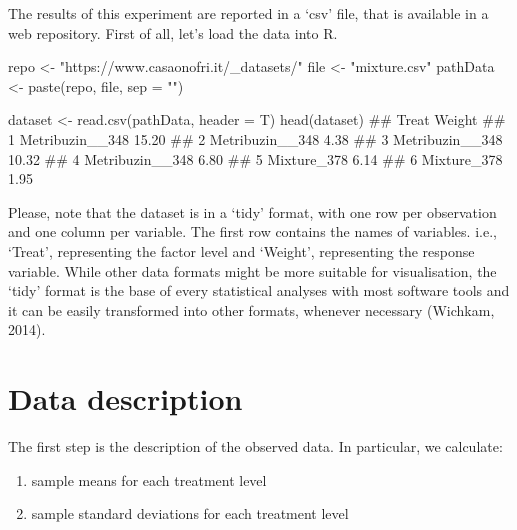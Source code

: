 \documentclass[a4paper,12pt,oneside]{book}
\providecommand{\tightlist}{%
  \setlength{\itemsep}{0pt}\setlength{\parskip}{0pt}}
\newenvironment{Shaded}{\begin{snugshade}}{\end{snugshade}}
\newcommand{\StringTok}[1]{#1}
\newcommand{\DocumentationTok}[1]{#1}
\newcommand{\OtherTok}[1]{#1}
\newcommand{\FunctionTok}[1]{#1}
\newcommand{\AttributeTok}[1]{#1}
\newcommand{\NormalTok}[1]{#1}
\begin{document}
The results of this experiment are reported in a `csv' file, that is available in a web repository. First of all, let's load the data into R.

\vspace{12pt}

\begin{Shaded}
\begin{Highlighting}[]
\NormalTok{repo }\OtherTok{\textless{}{-}} \StringTok{"https://www.casaonofri.it/\_datasets/"}
\NormalTok{file }\OtherTok{\textless{}{-}} \StringTok{"mixture.csv"}
\NormalTok{pathData }\OtherTok{\textless{}{-}} \FunctionTok{paste}\NormalTok{(repo, file, }\AttributeTok{sep =} \StringTok{""}\NormalTok{)}

\NormalTok{dataset }\OtherTok{\textless{}{-}} \FunctionTok{read.csv}\NormalTok{(pathData, }\AttributeTok{header =}\NormalTok{ T)}
\FunctionTok{head}\NormalTok{(dataset)}
\DocumentationTok{\#\#             Treat Weight}
\DocumentationTok{\#\# 1 Metribuzin\_\_348  15.20}
\DocumentationTok{\#\# 2 Metribuzin\_\_348   4.38}
\DocumentationTok{\#\# 3 Metribuzin\_\_348  10.32}
\DocumentationTok{\#\# 4 Metribuzin\_\_348   6.80}
\DocumentationTok{\#\# 5     Mixture\_378   6.14}
\DocumentationTok{\#\# 6     Mixture\_378   1.95}
\end{Highlighting}
\end{Shaded}

Please, note that the dataset is in a `tidy' format, with one row per observation and one column per variable. The first row contains the names of variables. i.e., `Treat', representing the factor level and `Weight', representing the response variable. While other data formats might be more suitable for visualisation, the `tidy' format is the base of every statistical analyses with most software tools and it can be easily transformed into other formats, whenever necessary (Wichkam, 2014).

\hypertarget{data-description}{%
\section{Data description}\label{data-description}}

The first step is the description of the observed data. In particular, we calculate:

\begin{enumerate}
\def\labelenumi{\arabic{enumi}.}
\tightlist
\item
  sample means for each treatment level
\item
  sample standard deviations for each treatment level
\end{enumerate}
\end{document}
